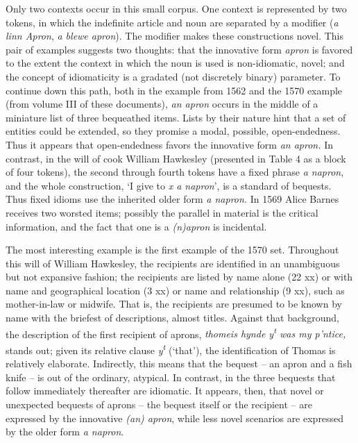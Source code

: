 \documentclass[output=paper,
modfonts
]{LSP/langsci}
\begin{document}
Only two contexts occur in this small corpus. One context is represented
by two tokens, in which the indefinite article and noun are separated by
a modifier (\emph{a linn Apron}, \emph{a blewe apron}). The modifier
makes these constructions novel. This pair of examples suggests two
thoughts: that the innovative form \emph{apron} is favored to the extent
the context in which the noun is used is non-idiomatic, novel; and the
concept of idiomaticity is a gradated (not discretely binary) parameter.
To continue down this path, both in the example from 1562 and the 1570
example (from volume III of these documents), \emph{an apron} occurs in
the middle of a miniature list of three bequeathed items. Lists by their
nature hint that a set of entities could be extended, so they promise a
modal, possible, open-endedness. Thus it appears that open-endedness
favors the innovative form \emph{an apron.} In contrast, in the will of
cook William Hawkesley (presented in Table 4 as a block of four tokens),
the second through fourth tokens have a fixed phrase \emph{a napron},
and the whole construction, `I give to \emph{x a napron}', is a standard
 of bequests. Thus fixed idioms use the inherited older form
\emph{a napron.} In 1569 Alice Barnes receives two worsted items;
possibly the parallel in material is the critical information, and the
fact that one is a \emph{(n)apron} is incidental.

\newpage 
The most interesting example is the first example of the 1570 set.
Throughout this will of William Hawkesley, the recipients are identified
in an unambiguous but not expansive fashion; the recipients are listed
by name alone (22 xx) or with name and geographical location (3 xx) or
name and relationship (9 xx), such as mother-in-law or midwife. That is,
the recipients are presumed to be known by name with the briefest of
descriptions, almost titles. Against that background, the description of
the first recipient of aprons, \emph{thomeis hynde y\textsuperscript{t}
was my p'ntice,} stands out; given its relative clause
\emph{y\textsuperscript{t}} (`that'), the identification of Thomas is
relatively elaborate. Indirectly, this means that the bequest -- an apron
and a fish knife -- is out of the ordinary, atypical. In contrast, in the
three bequests that follow immediately thereafter are idiomatic. It
appears, then, that novel or unexpected bequests of aprons -- the bequest
itself or the recipient -- are expressed by the innovative \emph{(an)
apron}, while less novel scenarios are expressed by the older form
\emph{a napron}.
\end{document}
